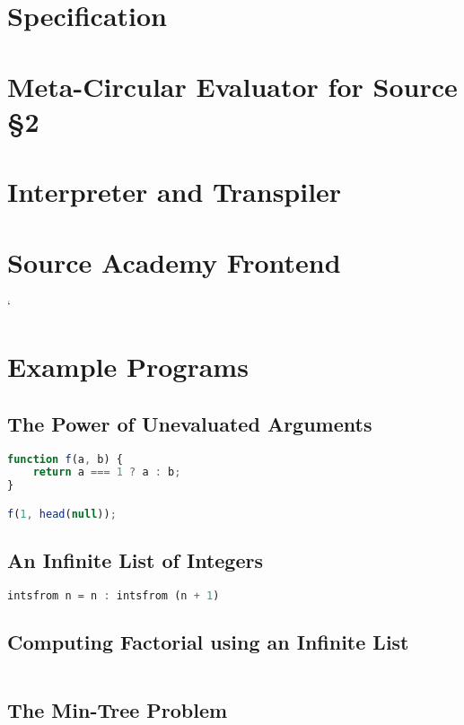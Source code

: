 \documentclass[12pt,a4paper]{report}
\begin{document}
\chapter{Specification}

\chapter{Meta-Circular Evaluator for Source \S2}

\chapter{Interpreter and Transpiler}

\chapter{Source Academy Frontend}`

\chapter{Example Programs}
\section{The Power of Unevaluated Arguments}
\begin{lstlisting}[language=JavaScript]
function f(a, b) {
	return a === 1 ? a : b;
}

f(1, head(null));
\end{lstlisting}
\section{An Infinite List of Integers}
\begin{lstlisting}[language=haskell]
intsfrom n = n : intsfrom (n + 1)
\end{lstlisting}
\section{Computing Factorial using an Infinite List}
\begin{lstlisting}[language=haskell]
\end{lstlisting}
\section{The Min-Tree Problem}
\end{document}
